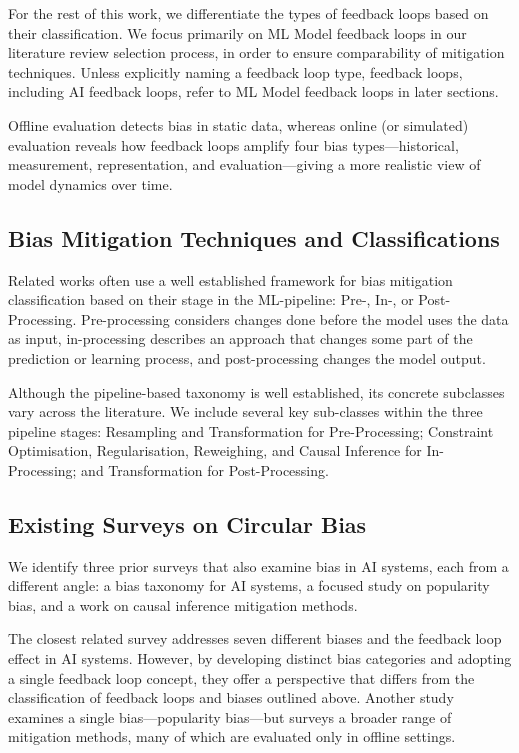 \documentclass[11pt]{article}
\begin{document}
For the rest of this work, we differentiate the types of feedback loops based on their classification. We focus primarily on ML Model feedback loops in our literature review selection process, in order to ensure comparability of mitigation techniques. Unless explicitly naming a feedback loop type, feedback loops, including AI feedback loops, refer to ML Model feedback loops in later sections.

Offline evaluation detects bias in static data, whereas online (or simulated) evaluation reveals how feedback loops amplify four bias types---historical, measurement, representation, and evaluation---giving a more realistic view of model dynamics over time.

\subsection{Bias Mitigation Techniques and Classifications}

Related works often use a well established framework for bias mitigation classification based on their stage in the ML-pipeline: Pre-, In-, or Post-Processing. Pre-processing considers changes done before the model uses the data as input, in-processing describes an approach that changes some part of the prediction or learning process, and post-processing changes the model output.

Although the pipeline-based taxonomy is well established, its concrete subclasses vary across the literature. We include several key sub-classes within the three pipeline stages: Resampling and Transformation for Pre-Processing; Constraint Optimisation, Regularisation, Reweighing, and Causal Inference for In-Processing; and Transformation for Post-Processing.

\subsection{Existing Surveys on Circular Bias}

We identify three prior surveys that also examine bias in AI systems, each from a different angle: a bias taxonomy for AI systems, a focused study on popularity bias, and a work on causal inference mitigation methods.

The closest related survey addresses seven different biases and the feedback loop effect in AI systems. However, by developing distinct bias categories and adopting a single feedback loop concept, they offer a perspective that differs from the classification of feedback loops and biases outlined above. Another study examines a single bias---popularity bias---but surveys a broader range of mitigation methods, many of which are evaluated only in offline settings.
\end{document}
